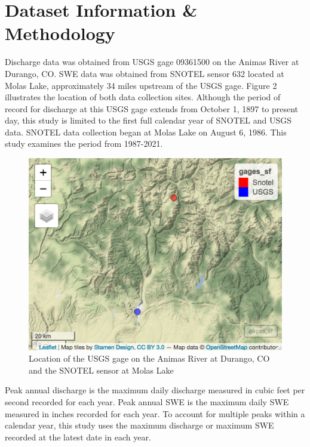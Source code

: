 \documentclass[
  12pt,
]{article}
\begin{document}
\newpage

\hypertarget{dataset-information-methodology}{%
\section{Dataset Information \&
Methodology}\label{dataset-information-methodology}}

Discharge data was obtained from USGS gage 09361500 on the Animas River
at Durango, CO. SWE data was obtained from SNOTEL sensor 632 located at
Molas Lake, approximately 34 miles upstream of the USGS gage. Figure 2
illustrates the location of both data collection sites. Although the
period of record for discharge at this USGS gage extends from October 1,
1897 to present day, this study is limited to the first full calendar
year of SNOTEL and USGS data. SNOTEL data collection began at Molas Lake
on August 6, 1986. This study examines the period from 1987-2021.

\begin{figure}
\centering
\includegraphics{gage_locations.png}
\caption{Location of the USGS gage on the Animas River at Durango, CO
and the SNOTEL sensor at Molas Lake}
\end{figure}

Peak annual discharge is the maximum daily discharge measured in cubic
feet per second recorded for each year. Peak annual SWE is the maximum
daily SWE measured in inches recorded for each year. To account for
multiple peaks within a calendar year, this study uses the maximum
discharge or maximum SWE recorded at the latest date in each year.

\newpage
\end{document}

